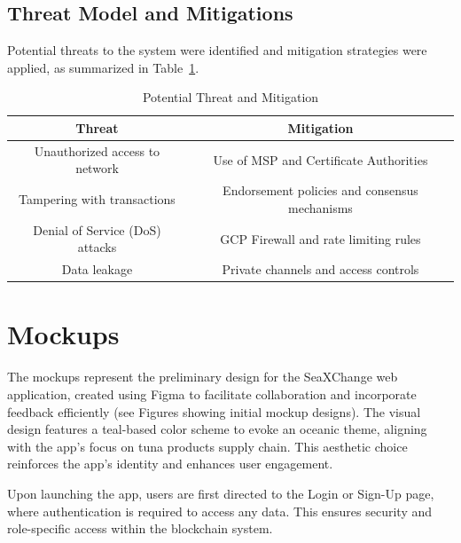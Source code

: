 \subsection{Threat Model and Mitigations}
Potential threats to the system were identified and mitigation strategies were applied, as summarized in Table~\ref{tab:threat}.
\begin{table}[h]
	\centering
	\begin{tabular}{|c|c|}
		\hline
		\textbf{Threat} & \textbf{Mitigation} \\
		\hline
		Unauthorized access to network & Use of MSP and Certificate Authorities \\
		\hline
		Tampering with transactions & Endorsement policies and consensus mechanisms \\
		\hline
		Denial of Service (DoS) attacks & GCP Firewall and rate limiting rules \\
		\hline
		Data leakage & Private channels and access controls \\
		\hline
	\end{tabular}
	\caption{Potential Threat and Mitigation}
	\label{tab:threat}
\end{table}


\section{Mockups}
The mockups represent the preliminary design for the SeaXChange web application, created using Figma to facilitate collaboration and incorporate feedback efficiently (see Figures showing initial mockup designs). The visual design features a teal-based color scheme to evoke an oceanic theme, aligning with the app’s focus on tuna products supply chain. This aesthetic choice reinforces the app’s identity and enhances user engagement.

Upon launching the app, users are first directed to the Login or Sign-Up page, where authentication is required to access any data. This ensures security and role-specific access within the blockchain system.

